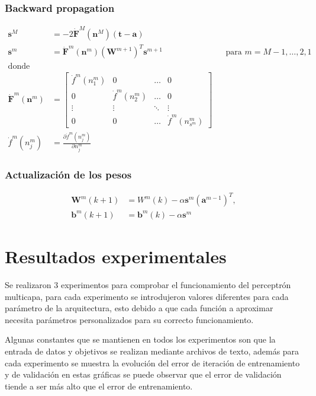 \documentclass[12pt, titlepage]{article}
\begin{document}
\subsubsection{Backward propagation}
\begin{align*}
    \boldsymbol{s}^M &= 
-2\boldsymbol{\dot{F}}^{M}(\boldsymbol{n}^{M})(\boldsymbol{t-a}) \\
    \boldsymbol{s}^{m} &= 
\boldsymbol{\dot{F}}^{m}(\boldsymbol{n}^{m})(\boldsymbol{W}^{m+1})^{T}
\boldsymbol{s}^{m+1} & & \text{para $m=M-1, \ldots, 2, 1$} \\
\text{donde} \\
\boldsymbol{\dot{F}}^{m}(\boldsymbol{n}^{m}) &=
\begin{bmatrix}
  \dot{f}^{m}(n_{1}^{m}) & 0 & \ldots & 0 \\
  0 & \dot{f}^{m}(n_{2}^{m}) & \ldots & 0 \\
  \vdots & \vdots & \ddots & \vdots \\
  0 & 0 & \ldots & \dot{f}^{m}(n_{s^{m}}^{m})
\end{bmatrix} \\
\dot{f}^{m}(n_{j}^{m}) &= 
\frac{\partial \dot{f}^{m}(n_{j}^{m})}{\partial n_{j}^{m}}
\end{align*}
\subsubsection{Actualización de los pesos}
\begin{align*}
    \boldsymbol{W}^{m}(k+1) &= W^{m}(k)-\alpha 
\boldsymbol{s}^{m}(\boldsymbol{a}^{m-1})^{T}, \\
\boldsymbol{b}^{m}(k+1) &= \boldsymbol{b}^{m}(k) - \alpha \boldsymbol{s}^{m}
\end{align*}

\newpage

\section{Resultados experimentales}
Se realizaron 3 experimentos para comprobar el funcionamiento del perceptrón multicapa, para cada experimento se introdujeron valores diferentes para cada parámetro de la arquitectura, esto debido a que cada función a aproximar necesita parámetros personalizados para su correcto funcionamiento.

Algunas constantes que se mantienen en todos los experimentos son que la entrada de datos y objetivos se realizan mediante archivos de texto, además para cada experimento se muestra la evolución del error de iteración de entrenamiento y de validación en estas gráficas se puede observar que el error de validación tiende a ser más alto que el error de entrenamiento.
\end{document}

